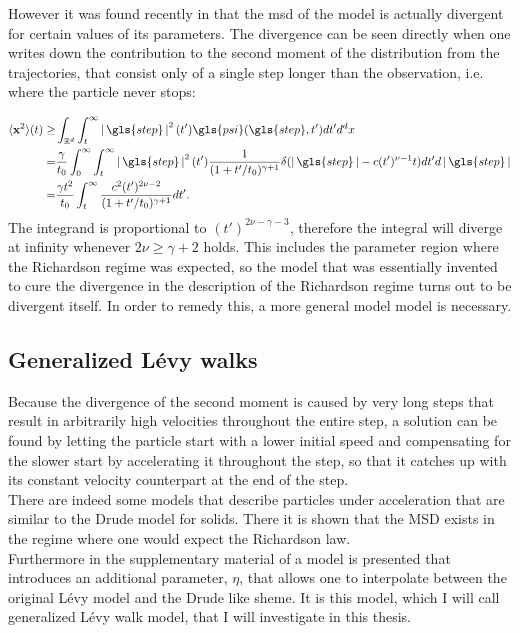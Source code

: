 However it was found recently in \cite{radons2018} that the \gls{msd} of the model is actually divergent for certain values of its parameters. The divergence can be seen directly when one writes down the contribution to the second moment of the distribution from the trajectories, that consist only of a single step longer than the observation, i.e. where the particle never stops:

\begin{align}
\mean{\ve{x}^2}(t) \geq& \int_{\mathbb{R}^d} \int_{t}^{\infty} \abs{\gls{step}}^{2}(t') \gls{psi}(\gls{step},t') dt' d^{d}x \\
=& \frac{\gamma}{t_0} \int_{0}^{\infty} \int_{t}^{\infty} \abs{\gls{step}}^{2}(t')  \frac{1}{(1+t'/t_0)^{\gamma+1}}  \delta(\abs{\gls{step}} - c (t')^{\nu-1}t)  dt' d\abs{\gls{step}} \\
=& \frac{\gamma t^2}{t_0}  \int_{t}^{\infty}   \frac{c^2 (t')^{2\nu-2}}{(1+t'/t_0)^{\gamma+1}}    dt'  .
\end{align}
%
The integrand is proportional to $(t')^{2\nu-\gamma-3}$, therefore the integral will diverge at infinity whenever $2 \nu \geq \gamma +2$ holds. This includes the parameter region where the Richardson regime was expected, so the model that was essentially invented to cure the divergence in the description of the Richardson regime turns out to be divergent itself. In order to remedy this, a more general model model is necessary.


\subsection{Generalized L\'evy walks}

Because the divergence of the second moment is caused by very long steps that result in arbitrarily high velocities throughout the entire step, a solution can be found by letting the particle start with a lower initial speed and compensating for the slower start by accelerating it throughout the step, so that it catches up with its constant velocity counterpart at the end of the step. \\
There are indeed some models that describe particles under acceleration \cite{schulz1997, BarkaiKlafterBuch} that are similar to the Drude model for solids. There it is shown that the MSD exists in the regime where one would expect the Richardson law. \\
Furthermore in the supplementary material of \cite{radons2018} a model is presented that introduces an additional parameter, $\eta$, that allows one to interpolate between the original L\'evy model and the Drude like sheme. It is this model, which I will call generalized L\'evy walk model, that I will investigate in this thesis. \\

